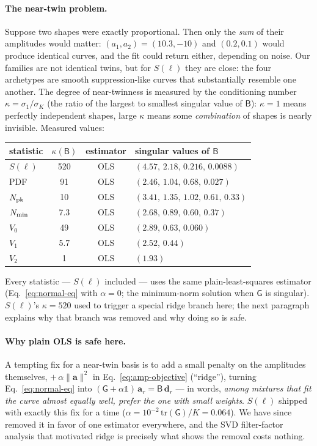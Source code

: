 \paragraph{The near-twin problem.}
Suppose two shapes were exactly proportional.  Then only the \emph{sum}
of their amplitudes would matter: $(a_1,a_2)=(10.3,-10)$ and $(0.2,0.1)$
would produce identical curves, and the fit could return either,
depending on noise.  Our families are not identical twins, but for
$S(\ell)$ they are close: the four archetypes are smooth suppression-like
curves that substantially resemble one another.  The degree of
near-twinness is measured by the conditioning number
$\kappa=\sigma_1/\sigma_K$ (the ratio of the largest to smallest singular
value of $\mathsf{B}$): $\kappa=1$ means perfectly independent shapes,
large $\kappa$ means some \emph{combination} of shapes is nearly
invisible.  Measured values:
\begin{center}
\begin{tabular}{lccl}
statistic & $\kappa(\mathsf{B})$ & estimator & singular values of $\mathsf{B}$\\
\hline
$S(\ell)$    & 520  & OLS & $(4.57,\,2.18,\,0.216,\,0.0088)$\\
PDF          & 91   & OLS   & $(2.46,\,1.04,\,0.68,\,0.027)$\\
$N_{\rm pk}$ & 10   & OLS   & $(3.41,\,1.35,\,1.02,\,0.61,\,0.33)$\\
$N_{\rm min}$& 7.3  & OLS   & $(2.68,\,0.89,\,0.60,\,0.37)$\\
$V_0$        & 49   & OLS   & $(2.89,\,0.63,\,0.060)$\\
$V_1$        & 5.7  & OLS   & $(2.52,\,0.44)$\\
$V_2$        & 1    & OLS   & $(1.93)$\\
\end{tabular}
\end{center}
Every statistic --- $S(\ell)$ included --- uses the same plain-least-squares
estimator (Eq.~\ref{eq:normal-eq} with $\alpha=0$; the minimum-norm
solution when $\mathsf{G}$ is singular). $S(\ell)$'s $\kappa=520$ used to
trigger a special ridge branch here; the next paragraph explains why that
branch was removed and why doing so is safe.

\paragraph{Why plain OLS is safe here.}
A tempting fix for a near-twin basis is to add a small penalty on the
amplitudes themselves, $+\,\alpha\lVert\mathbf{a}\rVert^2$ in
Eq.~\ref{eq:amp-objective} (``ridge''), turning
Eq.~\ref{eq:normal-eq} into
$(\mathsf{G}+\alpha\mathbb{1})\,\mathbf{a}_r=\mathsf{B}\,\mathbf{d}_r$ ---
in words, \emph{among mixtures that fit the curve almost equally well,
prefer the one with small weights}. $S(\ell)$ shipped with exactly this
fix for a time ($\alpha=10^{-2}\,\mathrm{tr}(\mathsf{G})/K=0.064$). We
have since removed it in favor of one estimator everywhere, and the SVD
filter-factor analysis that motivated ridge is precisely what shows the
removal costs nothing.


